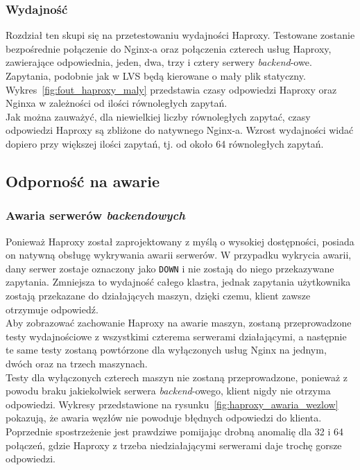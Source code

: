 \subsubsection{Wydajność}
Rozdział ten skupi się na przetestowaniu wydajności Haproxy.
Testowane zostanie bezpośrednie połączenie do Nginx-a oraz połączenia czterech usług Haproxy, zawierające odpowiednia, jeden, dwa, trzy i cztery serwery \textit{backend}-owe.\\
Zapytania, podobnie jak w LVS będą kierowane o mały plik statyczny.
Wykres~\ref{fig:fout_haproxy_maly} przedstawia czasy odpowiedzi Haproxy oraz Nginxa w zależności od ilości równoległych zapytań.\\
Jak można zauważyć, dla niewielkiej liczby równoległych zapytać, czasy odpowiedzi Haproxy są zbliżone do natywnego Nginx-a.
Wzrost wydajności widać dopiero przy większej ilości zapytań, tj. od około 64 równoległych zapytań.
\subsection{Odporność na awarie}
\subsubsection{Awaria serwerów \textit{backendowych}}
Ponieważ Haproxy został zaprojektowany z myślą o wysokiej dostępności, posiada on natywną obsługę wykrywania awarii serwerów.
W przypadku wykrycia awarii, dany serwer zostaje oznaczony jako \texttt{DOWN} i nie zostają do niego przekazywane zapytania.
Zmniejsza to wydajność całego klastra, jednak zapytania użytkownika zostają przekazane do działających maszyn, dzięki czemu, klient zawsze otrzymuje odpowiedź.\\
Aby zobrazować zachowanie Haproxy na awarie maszyn, zostaną przeprowadzone testy wydajnościowe z wszystkimi czterema serwerami działającymi, a następnie te same testy zostaną powtórzone dla wyłączonych usług Nginx na jednym, dwóch oraz na trzech maszynach.\\
Testy dla wyłączonych czterech maszyn nie zostaną przeprowadzone, ponieważ z powodu braku jakiekolwiek serwera \textit{backend}-owego, klient nigdy nie otrzyma odpowiedzi.
Wykresy przedstawione na rysunku~\ref{fig:haproxy_awaria_wezlow} pokazują, że awaria węzłów nie powoduje błędnych odpowiedzi do klienta.
Poprzednie spostrzeżenie jest prawdziwe pomijając drobną anomalię dla 32 i 64 połączeń, gdzie Haproxy z trzeba niedziałającymi serwerami daje trochę gorsze odpowiedzi.

